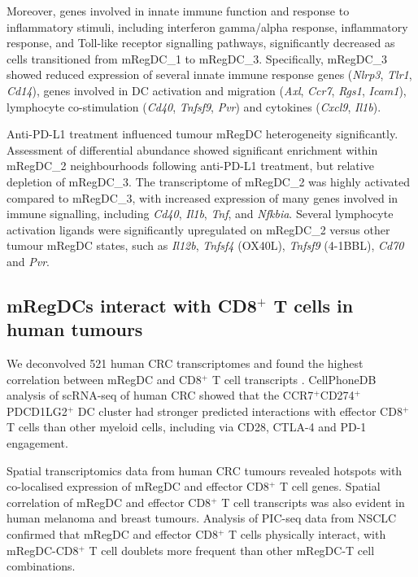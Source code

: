 \documentclass[11pt]{article}
\begin{document}
Moreover, genes involved in innate immune function and response to inflammatory stimuli, including interferon gamma/alpha response, inflammatory response, and Toll-like receptor signalling pathways, significantly decreased as cells transitioned from mRegDC\_1 to mRegDC\_3. Specifically, mRegDC\_3 showed reduced expression of several innate immune response genes (\textit{Nlrp3}, \textit{Tlr1}, \textit{Cd14}), genes involved in DC activation and migration (\textit{Axl}, \textit{Ccr7}, \textit{Rgs1}, \textit{Icam1}), lymphocyte co-stimulation (\textit{Cd40}, \textit{Tnfsf9}, \textit{Pvr}) and cytokines (\textit{Cxcl9}, \textit{Il1b}).

Anti-PD-L1 treatment influenced tumour mRegDC heterogeneity significantly. Assessment of differential abundance showed significant enrichment within mRegDC\_2 neighbourhoods following anti-PD-L1 treatment, but relative depletion of mRegDC\_3. The transcriptome of mRegDC\_2 was highly activated compared to mRegDC\_3, with increased expression of many genes involved in immune signalling, including \textit{Cd40}, \textit{Il1b}, \textit{Tnf}, and \textit{Nfkbia}. Several lymphocyte activation ligands \citep{croft2009, johnston2015} were significantly upregulated on mRegDC\_2 versus other tumour mRegDC states, such as \textit{Il12b}, \textit{Tnfsf4} (OX40L), \textit{Tnfsf9} (4-1BBL), \textit{Cd70} and \textit{Pvr}.

\subsection{mRegDCs interact with CD8$^+$ T cells in human tumours}

We deconvolved 521 human CRC transcriptomes and found the highest correlation between mRegDC and CD8$^+$ T cell transcripts \citep{becht2016}. CellPhoneDB analysis \citep{efremova2020} of scRNA-seq of human CRC \citep{pelka2021} showed that the CCR7$^+$CD274$^+$PDCD1LG2$^+$ DC cluster had stronger predicted interactions with effector CD8$^+$ T cells than other myeloid cells, including via CD28, CTLA-4 and PD-1 engagement.

Spatial transcriptomics data from human CRC tumours revealed hotspots with co-localised expression of mRegDC and effector CD8$^+$ T cell genes. Spatial correlation of mRegDC and effector CD8$^+$ T cell transcripts was also evident in human melanoma and breast tumours. Analysis of PIC-seq data from NSCLC \citep{tietscher2023} confirmed that mRegDC and effector CD8$^+$ T cells physically interact, with mRegDC-CD8$^+$ T cell doublets more frequent than other mRegDC-T cell combinations.
\end{document}
